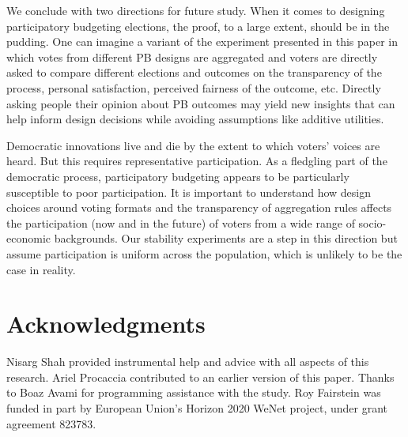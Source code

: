 \documentclass{comsoc2023}
\begin{document}
We conclude with  two directions for future study. %
When it comes to designing participatory budgeting elections, the proof, to a large extent, should be in the pudding.  %
One can imagine a  variant of the experiment presented in this paper in which votes from different PB designs are aggregated and voters are directly asked to compare different elections and outcomes on the transparency of the process, personal satisfaction, perceived fairness of the outcome, etc. 
Directly asking people their opinion about PB outcomes may yield new  insights   that can help inform design decisions while avoiding assumptions like  additive utilities. 

Democratic innovations live and die by the extent to which voters' voices are heard. But this requires representative participation. %
As a fledgling part of the democratic process, participatory budgeting appears to be particularly susceptible to poor participation. It is important to understand how   design choices around voting formats and the transparency of aggregation rules affects the participation (now and in the future) of voters from a wide range of socio-economic backgrounds. Our stability experiments are a step in this direction but assume participation is uniform across the population, which is unlikely to be the case in reality. 


\section{Acknowledgments}
Nisarg Shah provided instrumental help and advice with all aspects of this research. Ariel Procaccia contributed to an earlier version of this paper. Thanks to Boaz Avami for programming assistance with the study. Roy Fairstein was funded in part by European Union’s Horizon 2020 WeNet project, under grant agreement 823783. 




\end{document}
